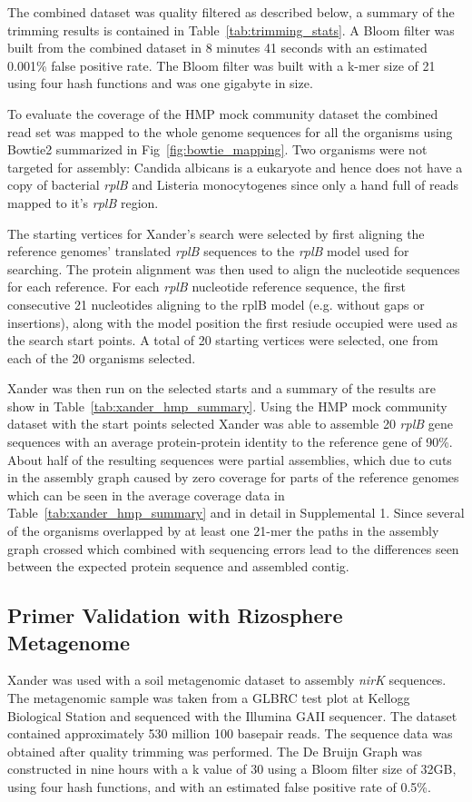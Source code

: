 \documentclass[10pt]{bmc_article}
\newenvironment{bmcformat}{\begin{raggedright}\baselineskip20pt\sloppy\setboolean{publ}{false}}{\end{raggedright}\baselineskip20pt\sloppy}
\begin{document}
\begin{bmcformat}
The combined dataset was quality filtered as described below, a summary of the trimming results is contained in Table~\ref{tab:trimming_stats}.  A Bloom filter was built from the combined dataset in 8 minutes 41 seconds with an estimated 0.001\% false positive rate.  The Bloom filter was built with a k-mer size of 21 using four hash functions and was one gigabyte in size.

To evaluate the coverage of the HMP mock community dataset the combined read set was mapped to the whole genome sequences for all the organisms using Bowtie2\cite{langmead_fast_2012} summarized in Fig~\ref{fig:bowtie_mapping}.  Two organisms were not targeted for assembly: Candida albicans is a eukaryote and hence does not have a copy of bacterial \emph{rplB} and Listeria monocytogenes since only a hand full of reads mapped to it's \emph{rplB} region.

The starting vertices for Xander's search were selected by first aligning the reference genomes' translated \emph{rplB} sequences to the \emph{rplB} model used for searching.  The protein alignment was then used to align the nucleotide sequences for each reference.  For each \emph{rplB} nucleotide reference sequence, the first consecutive 21 nucleotides aligning to the rplB model (e.g. without gaps or insertions), along with the model position the first resiude occupied were used as the search start points.  A total of 20 starting vertices were selected, one from each of the 20 organisms selected.

Xander was then run on the selected starts and a summary of the results are show in Table~\ref{tab:xander_hmp_summary}.  Using the HMP mock community dataset with the start points selected Xander was able to assemble 20 \emph{rplB} gene sequences with an average protein-protein identity to the reference gene of 90\%.  About half of the resulting sequences were partial assemblies, which due to cuts in the assembly graph caused by zero coverage for parts of the reference genomes which can be seen in the average coverage data in Table~\ref{tab:xander_hmp_summary} and in detail in Supplemental 1.  Since several of the organisms overlapped by at least one 21-mer the paths in the assembly graph crossed which combined with sequencing errors lead to the differences seen between the expected protein sequence and assembled contig.

\subsection*{Primer Validation with Rizosphere Metagenome}
Xander was used with a soil metagenomic dataset to assembly \emph{nirK} sequences.  The metagenomic sample was taken from a GLBRC test plot at Kellogg Biological Station and sequenced with the Illumina GAII sequencer.  The dataset contained approximately 530 million 100 basepair reads.  The sequence data was obtained after quality trimming was performed. The De Bruijn Graph was constructed in nine hours with a k value of 30 using a Bloom filter size of 32GB, using four hash functions, and with an estimated false positive rate of 0.5\%.


\end{bmcformat}
\end{document}
